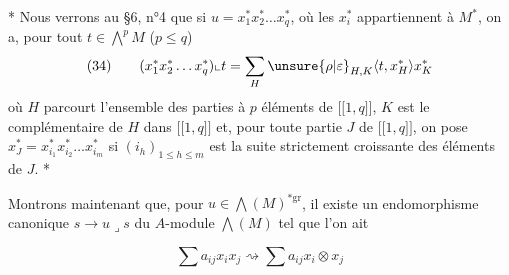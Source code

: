 * Nous verrons au §6, n°4 que si $u=x_1^*x_2^*\ldots x_q^*$, où les $x_i^*$ appartiennent à $M^*$, on a, pour tout $t\in\bigwedge^pM$ ($p\leq q$)
\[
(34)\qquad(x_1^*x_2^*\ldots x_q^*)\llcorner t=\sum_H\unsure{\rho|\varepsilon}_{H,K}\langle t,x_H^*\rangle x_K^*
\]
où $H$ parcourt l'ensemble des parties à $p$ éléments de $\lbrack\!\lbrack1,q\rbrack\!\rbrack$, $K$ est le complémentaire de $H$ dans $\lbrack\!\lbrack1,q\rbrack\!\rbrack$ et, pour toute partie $J$ de $\lbrack\!\lbrack1,q\rbrack\!\rbrack$, on pose $x_J^*=x_{i_1}^*x_{i_2}^*\ldots x_{i_m}^*$ si $(i_h)_{1\leq h\leq m}$ est la suite strictement croissante des éléments de $J$. *

Montrons maintenant que, pour $u\in\bigwedge(M)^{*\mathrm{gr}}$, il existe un endomorphisme canonique $s\longrightarrow u\lrcorner s$ du $A$-module $\bigwedge(M)$ tel que l'on ait


\[
\sum a_{ij}x_ix_j\rightsquigarrow\sum a_{ij}x_i\otimes x_j
\]

